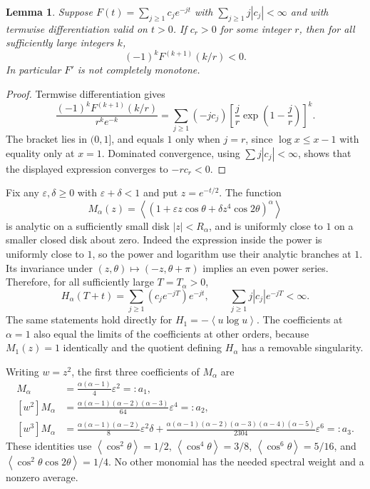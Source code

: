 \documentclass[11pt]{article}
\newtheorem{lemma}[theorem]{Lemma}
\newcommand{\av}[1]{\left\langle #1\right\rangle}
\begin{document}
\begin{lemma}\label{lem:spectral}
Suppose $F(t)=\sum_{j\ge1}c_j e^{-jt}$ with $\sum_{j\ge1}j|c_j|<\infty$ and with termwise differentiation valid on $t>0$. If $c_r>0$ for some integer $r$, then for all sufficiently large integers $k$,
\[
 (-1)^k F^{(k+1)}(k/r)<0.
\]
In particular $F'$ is not completely monotone.
\end{lemma}
\begin{proof}
Termwise differentiation gives
\[
 \frac{(-1)^kF^{(k+1)}(k/r)}{r^k e^{-k}}
 =\sum_{j\ge1}(-jc_j)\left[\frac jr\exp\left(1-\frac jr\right)\right]^k.
\]
The bracket lies in $(0,1]$, and equals $1$ only when $j=r$, since $\log x\le x-1$ with equality only at $x=1$. Dominated convergence, using $\sum j|c_j|<\infty$, shows that the displayed expression converges to $-rc_r<0$.
\end{proof}

Fix any $\varepsilon,\delta\ge0$ with $\varepsilon+\delta<1$ and put $z=e^{-t/2}$. The function
\[
 M_\alpha(z)=\av{(1+\varepsilon z\cos\theta+\delta z^4\cos2\theta)^\alpha}
\]
is analytic on a sufficiently small disk $|z|<R_\alpha$, and is uniformly close to $1$ on a smaller closed disk about zero. Indeed the expression inside the power is uniformly close to $1$, so the power and logarithm use their analytic branches at $1$. Its invariance under $(z,\theta)\mapsto(-z,\theta+\pi)$ implies an even power series. Therefore, for all sufficiently large $T=T_\alpha>0$,
\[
 H_\alpha(T+t)=\sum_{j\ge1}(c_j e^{-jT})e^{-jt},\qquad \sum_{j\ge1}j|c_j|e^{-jT}<\infty.
\]
The same statements hold directly for $H_1=-\av{u\log u}$. The coefficients at $\alpha=1$ also equal the limits of the coefficients at other orders, because $M_1(z)=1$ identically and the quotient defining $H_\alpha$ has a removable singularity.

Writing $w=z^2$, the first three coefficients of $M_\alpha$ are
\begin{align*}
 [w]M_\alpha&=\frac{\alpha(\alpha-1)}4\varepsilon^2=:a_1,\\
 [w^2]M_\alpha&=\frac{\alpha(\alpha-1)(\alpha-2)(\alpha-3)}{64}\varepsilon^4=:a_2,\\
 [w^3]M_\alpha&=\frac{\alpha(\alpha-1)(\alpha-2)}8\varepsilon^2\delta
 +\frac{\alpha(\alpha-1)(\alpha-2)(\alpha-3)(\alpha-4)(\alpha-5)}{2304}\varepsilon^6=:a_3.
\end{align*}
These identities use $\av{\cos^2\theta}=1/2$, $\av{\cos^4\theta}=3/8$, $\av{\cos^6\theta}=5/16$, and $\av{\cos^2\theta\cos2\theta}=1/4$. No other monomial has the needed spectral weight and a nonzero average.
\end{document}
